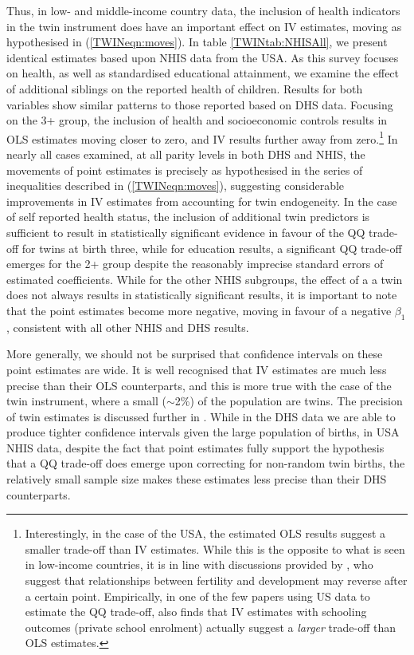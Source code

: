 Thus, in low- and middle-income country data, the inclusion of health 
indicators in the twin instrument does have an important effect on IV 
estimates, moving as hypothesised in (\ref{TWINeqn:moves}).  In table 
\ref{TWINtab:NHISAll}, we present identical estimates based upon NHIS data from
the USA. As this survey focuses on health, as well as standardised educational 
attainment, we examine the effect of additional siblings on the reported health
of children. Results for both variables show similar patterns to those reported 
based on DHS data.  Focusing on the 3+ group, the inclusion of health and 
socioeconomic controls results in OLS estimates moving closer to zero, and IV 
results further away from zero.\footnote{Interestingly, in the case of the USA,
the estimated OLS results suggest a smaller trade-off than IV estimates.  While
this is the opposite to what is seen in low-income countries, it is in line 
with discussions provided by \citet{Myrskylaetal2009}, who suggest that 
relationships between fertility and development may reverse after a certain 
point. Empirically, in one of the few papers using US data to estimate the 
QQ trade-off, \citet{Caceres2006} also finds that IV estimates with 
schooling outcomes (private school enrolment) actually suggest a \emph{larger}
trade-off than OLS estimates.} In nearly all cases examined, at all parity 
levels in both DHS and NHIS, the movements of point estimates is precisely as
hypothesised in the series of inequalities described in (\ref{TWINeqn:moves}), 
suggesting considerable improvements in IV estimates from accounting for twin
endogeneity.  In the case of self reported health status, the inclusion of 
additional twin predictors is sufficient to result in statistically significant 
evidence in favour of the QQ trade-off for twins at birth three, while for
education results, a significant QQ trade-off emerges for the 2+ group despite 
the reasonably imprecise standard errors of estimated coefficients. While for 
the other NHIS subgroups, the effect of a a twin does not always results in
statistically significant results, it is important to note that the point 
estimates become more negative, moving in favour of a negative $\beta_1$, 
consistent with all other NHIS and DHS results.

More generally, we should not be surprised that confidence intervals on these
point estimates are wide.  It is well recognised that IV estimates are much
less precise than their OLS counterparts, and this is more true with the case
of the twin instrument, where a small ($\sim$2\%) of the population are twins.
The precision of twin estimates is discussed further in \citet{Angristetal2010}.
While in the DHS data we are able to produce tighter confidence intervals given
the large population of births, in USA NHIS data, despite the fact that point 
estimates fully support the hypothesis that a QQ trade-off does emerge upon 
correcting for non-random twin births, the relatively small sample size makes 
these estimates less precise than their DHS counterparts.


